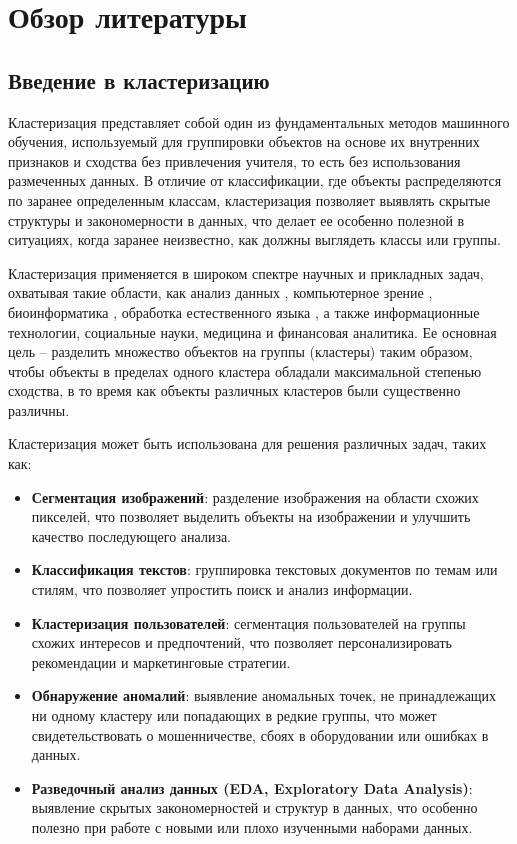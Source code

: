 \section{Обзор литературы}

    \subsection{Введение в кластеризацию}

        Кластеризация представляет собой один из фундаментальных методов машинного обучения, используемый для группировки объектов на основе их внутренних признаков и сходства без привлечения учителя, то есть без использования размеченных данных. В отличие от классификации, где объекты распределяются по заранее определенным классам, кластеризация позволяет выявлять скрытые структуры и закономерности в данных, что делает ее особенно полезной в ситуациях, когда заранее неизвестно, как должны выглядеть классы или группы.

        Кластеризация применяется в широком спектре научных и прикладных задач, охватывая такие области, как анализ данных \cite{SETYANINGSIH2012286}, компьютерное зрение \cite{Demidovskij2023ids}, биоинформатика \cite{Kiselev2019scRNAseqClustering}, обработка естественного языка \cite{Grootendorst2022BERTopic}, а также информационные технологии, социальные науки, медицина и финансовая аналитика. Ее основная цель -- разделить множество объектов на группы (кластеры) таким образом, чтобы объекты в пределах одного кластера обладали максимальной степенью сходства, в то время как объекты различных кластеров были существенно различны.

        Кластеризация может быть использована для решения различных задач, таких как:
        \begin{itemize}
            \item \textbf{Сегментация изображений}: разделение изображения на области схожих пикселей, что позволяет выделить объекты на изображении и улучшить качество последующего анализа.
            \item \textbf{Классификация текстов}: группировка текстовых документов по темам или стилям, что позволяет упростить поиск и анализ информации.
            \item \textbf{Кластеризация пользователей}: сегментация пользователей на группы схожих интересов и предпочтений, что позволяет персонализировать рекомендации и маркетинговые стратегии.
            \item \textbf{Обнаружение аномалий}: выявление аномальных точек, не принадлежащих ни одному кластеру или попадающих в редкие группы, что может свидетельствовать о мошенничестве, сбоях в оборудовании или ошибках в данных.
            \item \textbf{Разведочный анализ данных (EDA, Exploratory Data Analysis)}: выявление скрытых закономерностей и структур в данных, что особенно полезно при работе с новыми или плохо изученными наборами данных.
        \end{itemize}

